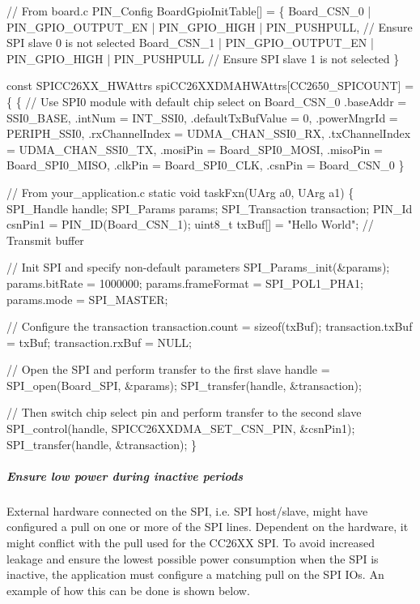 \begin{DoxyCode}
\textcolor{comment}{// From board.c}
PIN_Config BoardGpioInitTable[] = \{
    Board\_CSN\_0   | PIN_GPIO_OUTPUT_EN | PIN_GPIO_HIGH   | PIN_PUSHPULL,   \textcolor{comment}{// Ensure SPI slave 0 is not
       selected}
    Board\_CSN\_1   | PIN_GPIO_OUTPUT_EN | PIN_GPIO_HIGH   | PIN_PUSHPULL    \textcolor{comment}{// Ensure SPI slave 1 is not
       selected}
\}

\textcolor{keyword}{const} SPICC26XX_HWAttrs spiCC26XXDMAHWAttrs[CC2650\_SPICOUNT] = \{
\{   \textcolor{comment}{// Use SPI0 module with default chip select on Board\_CSN\_0}
    .baseAddr = SSI0\_BASE,
    .intNum = INT\_SSI0,
    .defaultTxBufValue = 0,
    .powerMngrId = PERIPH\_SSI0,
    .rxChannelIndex = UDMA\_CHAN\_SSI0\_RX,
    .txChannelIndex = UDMA\_CHAN\_SSI0\_TX,
    .mosiPin = Board\_SPI0\_MOSI,
    .misoPin = Board\_SPI0\_MISO,
    .clkPin = Board\_SPI0\_CLK,
    .csnPin = Board\_CSN\_0
\}

\textcolor{comment}{// From your\_application.c}
\textcolor{keyword}{static} \textcolor{keywordtype}{void} taskFxn(UArg a0, UArg a1)
\{
    SPI_Handle handle;
    SPI_Params params;
    SPI_Transaction transaction;
    PIN_Id csnPin1  = PIN_ID(Board\_CSN\_1);
    uint8\_t txBuf[] = \textcolor{stringliteral}{"Hello World"};    \textcolor{comment}{// Transmit buffer}

    \textcolor{comment}{// Init SPI and specify non-default parameters}
    SPI_Params_init(&params);
    params.bitRate     = 1000000;
    params.frameFormat = SPI_POL1_PHA1;
    params.mode        = SPI_MASTER;

    \textcolor{comment}{// Configure the transaction}
    transaction.count = \textcolor{keyword}{sizeof}(txBuf);
    transaction.txBuf = txBuf;
    transaction.rxBuf = NULL;

    \textcolor{comment}{// Open the SPI and perform transfer to the first slave}
    handle = SPI_open(Board\_SPI, &params);
    SPI_transfer(handle, &transaction);

    \textcolor{comment}{// Then switch chip select pin and perform transfer to the second slave}
    SPI_control(handle, SPICC26XXDMA_SET_CSN_PIN, &csnPin1);
    SPI_transfer(handle, &transaction);
\}
\end{DoxyCode}


\subparagraph*{Ensure low power during inactive periods\label{_s_p_i_c_c26_x_x_d_m_a_8h_USE_CASE_LPWR}%
\hypertarget{_s_p_i_c_c26_x_x_d_m_a_8h_USE_CASE_LPWR}{}%
}

External hardware connected on the S\+P\+I, i.\+e. S\+P\+I host/slave, might have configured a pull on one or more of the S\+P\+I lines. Dependent on the hardware, it might conflict with the pull used for the C\+C26\+X\+X S\+P\+I. To avoid increased leakage and ensure the lowest possible power consumption when the S\+P\+I is inactive, the application must configure a matching pull on the S\+P\+I I\+Os. An example of how this can be done is shown below.


